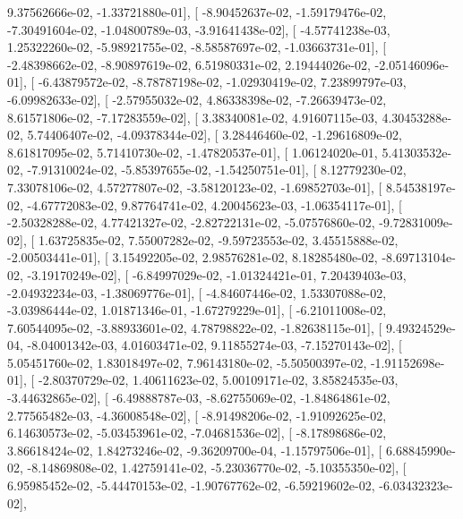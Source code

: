 \documentclass{article}
\begin{document}
          9.37562666e-02,  -1.33721880e-01],
       [ -8.90452637e-02,  -1.59179476e-02,  -7.30491604e-02,
         -1.04800789e-03,  -3.91641438e-02],
       [ -4.57741238e-03,   1.25322260e-02,  -5.98921755e-02,
         -8.58587697e-02,  -1.03663731e-01],
       [ -2.48398662e-02,  -8.90897619e-02,   6.51980331e-02,
          2.19444026e-02,  -2.05146096e-01],
       [ -6.43879572e-02,  -8.78787198e-02,  -1.02930419e-02,
          7.23899797e-03,  -6.09982633e-02],
       [ -2.57955032e-02,   4.86338398e-02,  -7.26639473e-02,
          8.61571806e-02,  -7.17283559e-02],
       [  3.38340081e-02,   4.91607115e-03,   4.30453288e-02,
          5.74406407e-02,  -4.09378344e-02],
       [  3.28446460e-02,  -1.29616809e-02,   8.61817095e-02,
          5.71410730e-02,  -1.47820537e-01],
       [  1.06124020e-01,   5.41303532e-02,  -7.91310024e-02,
         -5.85397655e-02,  -1.54250751e-01],
       [  8.12779230e-02,   7.33078106e-02,   4.57277807e-02,
         -3.58120123e-02,  -1.69852703e-01],
       [  8.54538197e-02,  -4.67772083e-02,   9.87764741e-02,
          4.20045623e-03,  -1.06354117e-01],
       [ -2.50328288e-02,   4.77421327e-02,  -2.82722131e-02,
         -5.07576860e-02,  -9.72831009e-02],
       [  1.63725835e-02,   7.55007282e-02,  -9.59723553e-02,
          3.45515888e-02,  -2.00503441e-01],
       [  3.15492205e-02,   2.98576281e-02,   8.18285480e-02,
         -8.69713104e-02,  -3.19170249e-02],
       [ -6.84997029e-02,  -1.01324421e-01,   7.20439403e-03,
         -2.04932234e-03,  -1.38069776e-01],
       [ -4.84607446e-02,   1.53307088e-02,  -3.03986444e-02,
          1.01871346e-01,  -1.67279229e-01],
       [ -6.21011008e-02,   7.60544095e-02,  -3.88933601e-02,
          4.78798822e-02,  -1.82638115e-01],
       [  9.49324529e-04,  -8.04001342e-03,   4.01603471e-02,
          9.11855274e-03,  -7.15270143e-02],
       [  5.05451760e-02,   1.83018497e-02,   7.96143180e-02,
         -5.50500397e-02,  -1.91152698e-01],
       [ -2.80370729e-02,   1.40611623e-02,   5.00109171e-02,
          3.85824535e-03,  -3.44632865e-02],
       [ -6.49888787e-03,  -8.62755069e-02,  -1.84864861e-02,
          2.77565482e-03,  -4.36008548e-02],
       [ -8.91498206e-02,  -1.91092625e-02,   6.14630573e-02,
         -5.03453961e-02,  -7.04681536e-02],
       [ -8.17898686e-02,   3.86618424e-02,   1.84273246e-02,
         -9.36209700e-04,  -1.15797506e-01],
       [  6.68845990e-02,  -8.14869808e-02,   1.42759141e-02,
         -5.23036770e-02,  -5.10355350e-02],
       [  6.95985452e-02,  -5.44470153e-02,  -1.90767762e-02,
         -6.59219602e-02,  -6.03432323e-02],
\end{document}
